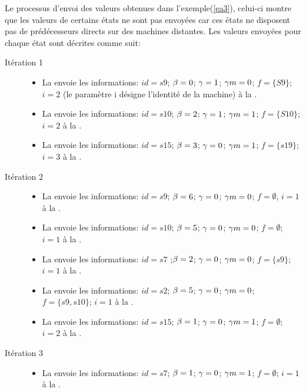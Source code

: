 \begin{Exemple}\label{ea4}
	Le processus d'envoi des valeurs obtenues dans l'exemple(\ref{ea3}), celui-ci montre que les valeurs de certains états ne sont pas envoyées car ces états ne disposent pas de prédécesseurs directs sur des machines distantes.  Les valeurs envoyées pour chaque état sont décrites comme suit:
	\begin{description}
	\item[Itération 1]
		\begin{itemize}
		\item La \mtwo{} envoie les informations: $id =s9$; $\beta{}=0$; $\gamma{}=1$; $\gamma m{}=0$; $f =\{S9\}$; $i=2$ (le paramètre i désigne l'identité de la machine) à la \mone{}.
		\item La \mtwo{} envoie les informations: $id =s10$; $\beta{}=2$; $\gamma{}=1$; $\gamma m{}=1$; $f =\{S10\}$; $i=2$  à la \mone{}.
		\item La \mtree{} envoie les informations: $id =s15$; $\beta{}=3$; $\gamma{}=0$; $\gamma m{}=1$; $f =\{s19\}$; $i=3$	 à la \mtwo{}.
		\end{itemize}
	\item[Itération 2]
		\begin{itemize}
			\item La \mone{} envoie les informations: $id =s9$; $\beta{} =6$; $\gamma{} =0$; $\gamma m{}=0$; $f =\emptyset$, $i=1$ à la \mtwo{}.
			\item  La \mone{} envoie les informations: $id =s10$; $\beta{}=5$; $\gamma{}=0$; $\gamma m{}=0$; $f =\emptyset$; $i=1$ à la \mtwo{}.
			\item  La \mone{} envoie les informations: $id =s7$ ;$\beta{}=2$; $\gamma{}=0$; $\gamma m{}=0$; $f =\{s9\}$; $i=1$ à la \mtwo{}.
			\item  La \mone{} envoie les informations: $id =s2$; $\beta{}=5$; $\gamma{}=0$; $\gamma m{}=0$; $f =\{s9,s10\}$; $i=1$ à la \mtree{}.
			\item  La \mtwo{} envoie les informations: $id =s15$; $\beta{}=1$; $\gamma{}=0$; $\gamma m{}=1$; $f =\emptyset$; $i=2$ à la \mtree{}.
			\end{itemize}	
\item[Itération 3]
		\begin{itemize}
			\item  La \mtwo{} envoie les informations: $id =s7$; $\beta{}=1$; $\gamma{}=0$; $\gamma m{}=1$; $f =\emptyset$; $i=1$ à la \mone{}.

\end{itemize}
\end{description}
\end{Exemple}
